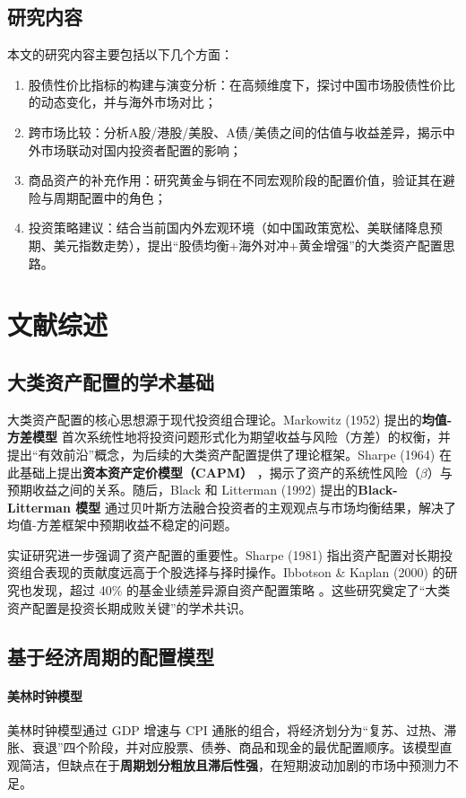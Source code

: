 \documentclass[a4paper,12pt]{article}
\numberwithin{equation}{section}
\begin{document}
\subsection{研究内容}
本文的研究内容主要包括以下几个方面：
\begin{enumerate}
    \item 股债性价比指标的构建与演变分析：在高频维度下，探讨中国市场股债性价比的动态变化，并与海外市场对比；
    \item 跨市场比较：分析A股/港股/美股、A债/美债之间的估值与收益差异，揭示中外市场联动对国内投资者配置的影响；
    \item 商品资产的补充作用：研究黄金与铜在不同宏观阶段的配置价值，验证其在避险与周期配置中的角色；
    \item 投资策略建议：结合当前国内外宏观环境（如中国政策宽松、美联储降息预期、美元指数走势），提出“股债均衡+海外对冲+黄金增强”的大类资产配置思路。
\end{enumerate}

\clearpage

\section{文献综述}

\subsection{大类资产配置的学术基础}
大类资产配置的核心思想源于现代投资组合理论。Markowitz (1952) 提出的\textbf{均值-方差模型} \cite{Markowitz1952} 首次系统性地将投资问题形式化为期望收益与风险（方差）的权衡，并提出“有效前沿”概念，为后续的大类资产配置提供了理论框架。Sharpe (1964) 在此基础上提出\textbf{资本资产定价模型（CAPM）} \cite{Sharpe1964}，揭示了资产的系统性风险（$\beta$）与预期收益之间的关系。随后，Black 和 Litterman (1992) 提出的\textbf{Black-Litterman 模型} \cite{BlackLitterman1992} 通过贝叶斯方法融合投资者的主观观点与市场均衡结果，解决了均值-方差框架中预期收益不稳定的问题。

实证研究进一步强调了资产配置的重要性。Sharpe (1981) \cite{Sharpe1981} 指出资产配置对长期投资组合表现的贡献度远高于个股选择与择时操作。Ibbotson \& Kaplan (2000) 的研究也发现，超过 40\% 的基金业绩差异源自资产配置策略 \cite{Ibbotson2000}。这些研究奠定了“大类资产配置是投资长期成败关键”的学术共识。

\subsection{基于经济周期的配置模型}
\paragraph{美林时钟模型}
美林时钟模型通过 GDP 增速与 CPI 通胀的组合，将经济划分为“复苏、过热、滞胀、衰退”四个阶段，并对应股票、债券、商品和现金的最优配置顺序。该模型直观简洁，但缺点在于\textbf{周期划分粗放且滞后性强}，在短期波动加剧的市场中预测力不足。
\end{document}
